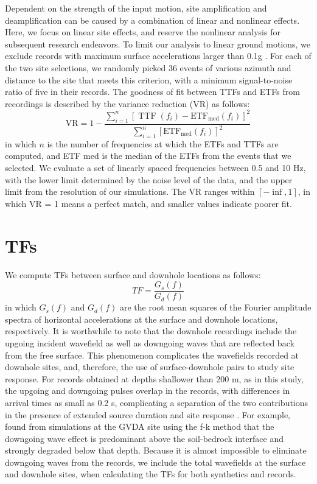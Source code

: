 Dependent on the strength of the input motion, site amplification and deamplification can be caused by a combination of linear and nonlinear effects. Here, we focus on linear site effects, and reserve the nonlinear analysis for subsequent research endeavors. To limit our analysis to linear ground motions, we exclude records with maximum surface accelerations larger than 0.1g . For each of the two site selections, we randomly picked 36 events of various azimuth and distance to the site that meets this criterion, with a minimum signal-to-noise ratio of five in their records. The goodness of fit between TTFs and ETFs from recordings is described by the variance reduction (VR) as follows:
\begin{equation}\label{eq:etf-1}
  \mathrm{VR}=1-\frac{\sum_{i=1}^{n}\left[\operatorname{TTF}\left(f_{i}\right)-\mathrm{ETF}_{\mathrm{med}}\left(f_{i}\right)\right]^{2}}{\sum_{i=1}^{n}\left[\mathrm{ETF}_{\mathrm{med}}\left(f_{i}\right)\right]^{2}}
\end{equation}
\noindent in which $n$ is the number of frequencies at which the ETFs and TTFs are computed, and ETF med is the median of the ETFs from the events that we selected. We evaluate a set of linearly spaced frequencies between 0.5 and 10 Hz, with the lower limit determined by the noise level of the data, and the upper limit from the resolution of our simulations. The VR ranges within $[-\inf, 1]$, in which VR = 1 means a perfect match, and smaller values indicate poorer fit.


\section{TFs}\label{etf:tfs}
We compute TFs between surface and downhole locations as follows:
\begin{equation}\label{eq:etf-2}
  TF = \frac{G_s(f)}{G_d(f)}
\end{equation}
\noindent in which $G_s(f)$ and $G_d(f)$ are the root mean squares of the Fourier amplitude spectra of horizontal accelerations at the surface and downhole locations, respectively. It is worthwhile to note that the downhole recordings include the upgoing incident wavefield as well as downgoing waves that are reflected back from the free surface. This phenomenon complicates the wavefields recorded at downhole sites, and, therefore, the use of surface-downhole pairs to study site response. For records obtained at depths shallower than 200 m, as in this study, the upgoing and downgoing pulses overlap in the records, with differences in arrival times as small as 0.2 s, complicating a separation of the two contributions in the presence of extended source duration and site response \citep{shearerSurfaceNearsurfaceEffects1987}. For example, \citet{bonillaBoreholeResponseStudies2002}  found from simulations at the GVDA site using the f-k method that the downgoing wave effect is predominant above the soil-bedrock interface and strongly degraded below that depth. Because it is almost impossible to eliminate downgoing waves from the records, we include the total wavefields at the surface and downhole sites, when calculating the TFs for both synthetics and records.

